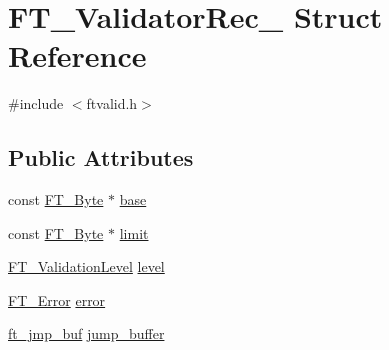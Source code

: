 \hypertarget{struct_f_t___validator_rec__}{\section{F\-T\-\_\-\-Validator\-Rec\-\_\- Struct Reference}
\label{struct_f_t___validator_rec__}
}


{\ttfamily \#include $<$ftvalid.\-h$>$}

\subsection*{Public Attributes}
\begin{DoxyCompactItemize}
\item 
const \hyperlink{fttypes_8h_a51f26183ca0c9f4af958939648caeccd}{F\-T\-\_\-\-Byte} $\ast$ \hyperlink{struct_f_t___validator_rec___a62de459b75acae3e1695b3d6600ca22f}{base}
\item 
const \hyperlink{fttypes_8h_a51f26183ca0c9f4af958939648caeccd}{F\-T\-\_\-\-Byte} $\ast$ \hyperlink{struct_f_t___validator_rec___acc4d58a3e46d2b7c92bb51c3ddd8d331}{limit}
\item 
\hyperlink{ftvalid_8h_a43709eb091f99dc7ae5f68f83cf2d670}{F\-T\-\_\-\-Validation\-Level} \hyperlink{struct_f_t___validator_rec___aa70830280c76507b8b06e616da8cb545}{level}
\item 
\hyperlink{fttypes_8h_a64c8060bdb3d6eec844a1bf670e06bdd}{F\-T\-\_\-\-Error} \hyperlink{struct_f_t___validator_rec___ab12d54f54a55a90ce19761a1c24e28f0}{error}
\item 
\hyperlink{ftstdlib_8h_a4c13ff957e7b63737a04c178c5b0fd86}{ft\-\_\-jmp\-\_\-buf} \hyperlink{struct_f_t___validator_rec___aa0b346f9ef78939e93c85389aa2b54b3}{jump\-\_\-buffer}
\end{DoxyCompactItemize}


